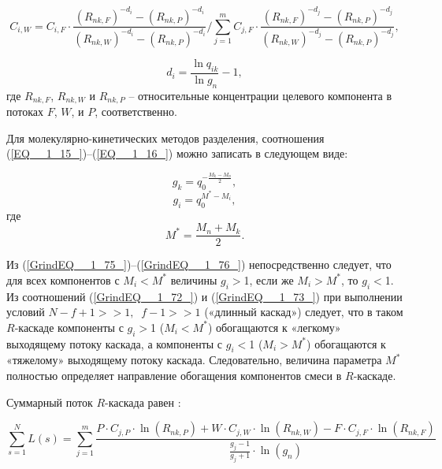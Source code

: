\begin{equation} \label{GrindEQ__1_73_} 
  C_{i,W}=C_{i,F} \cdot \frac{\left(R_{n k,F}\right)^{-d_{i}}-\left(R_{n k,P}\right)^{-d_{i}}}{\left(R_{n k,W}\right)^{-d_{i}}-\left(R_{n k,P}\right)^{-d_{i}}} / \sum_{j=1}^{m} C_{j,F} \cdot \frac{\left(R_{n k,F}\right)^{-d_{j}}-\left(R_{n k,P}\right)^{-d_{j}}}{\left(R_{n k,W}\right)^{-d_{j}}-\left(R_{n k,P}\right)^{-d_{j}}},
\end{equation} 

\begin{equation} \label{GrindEQ__1_74_} 
  d_{i} =\frac{\ln q_{ik} }{\ln g_{n} } -1,              
\end{equation}
где $R_{n k,F}$, $R_{n k,W}$ и $R_{n k,P}$ -- относительные концентрации целевого компонента в потоках $F$, $W$, и $P$, соответственно.


Для молекулярно-кинетических методов разделения, соотношения (\ref{EQ__1_15_})--(\ref{EQ__1_16_}) можно записать в следующем виде:

\begin{equation} \label{GrindEQ__1_75_} 
  g_{k} =q_{0}^{-\frac{M_{k} -M_{n} }{2} } ,        
\end{equation} 
\begin{equation} \label{GrindEQ__1_76_} 
  g_{i} =q_{0}^{M^{*} -M_{i} } ,        
\end{equation} 
где 
\begin{equation} \label{EQ_Mstar} 
  M^{*} =\frac{M_{n} +M_{k} }{2}.    
\end{equation} 

Из (\ref{GrindEQ__1_75_})--(\ref{GrindEQ__1_76_}) непосредственно следует, что для всех компонентов с $M_{i} $$\mathrm{<}$$M^{*} $ величины $g_{i} $$\mathrm{>}$1, если же $M_{i} $$\mathrm{>}$$M^{*} $, то $g_{i} $$\mathrm{<}$1. Из соотношений (\ref{GrindEQ__1_72_}) и (\ref{GrindEQ__1_73_}) при выполнении условий $N-f+1>>1,\; \; f-1>>1$ («длинный каскад») следует, что в таком $R$-каскаде компоненты с $g_{i} $$\mathrm{>}$1 ($M_{i} $$\mathrm{<}$$M^{*}$) обогащаются к «легкому» выходящему потоку каскада, а компоненты с $g_{i} $$\mathrm{<}$1 ($M_{i} $$\mathrm{>}$$M^{*}$) обогащаются к «тяжелому» выходящему потоку каскада. Следовательно, величина параметра $M^{*}$ полностью определяет направление обогащения компонентов смеси в $R$-каскаде. 

Суммарный поток $R$-каскада равен \cite{sulaberidzeTeoriyaKaskadovDlya2011}:

\begin{equation} \label{GrindEQ__1_77_} 
  \sum _{s=1}^{N}L(s) =\sum _{j=1}^{m}\frac{P \cdot C_{j,P} \cdot \ln(R_{nk,P}) +W \cdot C_{j,W} \cdot \ln(R_{nk,W}) -F \cdot C_{j,F} \cdot \ln(R_{nk,F})}{\frac{g_{j} -1}{g_{j} +1} \cdot \ln(g_{n})}              
\end{equation} 

